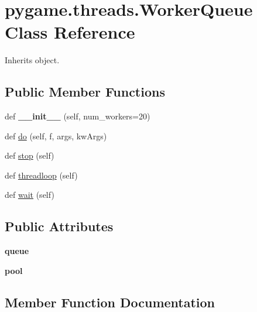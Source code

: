 \hypertarget{classpygame_1_1threads_1_1_worker_queue}{}\section{pygame.\+threads.\+Worker\+Queue Class Reference}
\label{classpygame_1_1threads_1_1_worker_queue}


Inherits object.

\subsection*{Public Member Functions}
\begin{DoxyCompactItemize}
\item 
\mbox{\label{classpygame_1_1threads_1_1_worker_queue_a5daf638700e5503baa8aaeb777e264ee}} 
def {\bfseries \+\_\+\+\_\+init\+\_\+\+\_\+} (self, num\+\_\+workers=20)
\item 
def \hyperlink{classpygame_1_1threads_1_1_worker_queue_ab3d602f127fb43f121cf3c7ced868a3f}{do} (self, f, args, kw\+Args)
\item 
def \hyperlink{classpygame_1_1threads_1_1_worker_queue_af53360f5b25ccabae9fda06bf2fc624d}{stop} (self)
\item 
def \hyperlink{classpygame_1_1threads_1_1_worker_queue_ab7bdb3c20aea724ab68d5dc1319d24d2}{threadloop} (self)
\item 
def \hyperlink{classpygame_1_1threads_1_1_worker_queue_a71960e68ef9c1f2b1499ab4f1b566da1}{wait} (self)
\end{DoxyCompactItemize}
\subsection*{Public Attributes}
\begin{DoxyCompactItemize}
\item 
\mbox{\label{classpygame_1_1threads_1_1_worker_queue_ad617da1bd46a2c57bfb547590476f906}} 
{\bfseries queue}
\item 
\mbox{\label{classpygame_1_1threads_1_1_worker_queue_a793623d76ec49e74ce7ee92db129f362}} 
{\bfseries pool}
\end{DoxyCompactItemize}


\subsection{Member Function Documentation}
\mbox{\label{classpygame_1_1threads_1_1_worker_queue_ab3d602f127fb43f121cf3c7ced868a3f}} 

